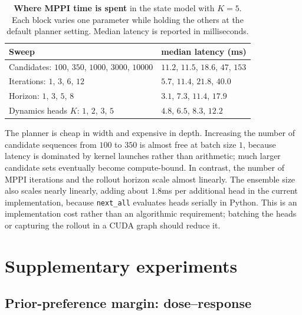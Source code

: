\documentclass{article} %
\begin{document}
\begin{table}[h]
\centering
\caption{%
  \textbf{Where MPPI time is spent} in the state model with $K=5$. Each block
  varies one parameter while holding the others at the default planner setting.
  Median latency is reported in milliseconds.}
\label{tab:app-mppi-breakdown}
\small
\begin{tabular}{ll}
\toprule
Sweep & median latency (ms) \\
\midrule
Candidates: $100$, $350$, $1000$, $3000$, $10000$
  & $11.2$, $11.5$, $18.6$, $47$, $153$ \\
Iterations: $1$, $3$, $6$, $12$
  & $5.7$, $11.4$, $21.8$, $40.0$ \\
Horizon: $1$, $3$, $5$, $8$
  & $3.1$, $7.3$, $11.4$, $17.9$ \\
Dynamics heads $K$: $1$, $2$, $3$, $5$
  & $4.8$, $6.5$, $8.3$, $12.2$ \\
\bottomrule
\end{tabular}
\end{table}

The planner is cheap in width and expensive in depth. Increasing the number of
candidate sequences from $100$ to $350$ is almost free at batch size $1$,
because latency is dominated by kernel launches rather than arithmetic; much
larger candidate sets eventually become compute-bound. In contrast, the number
of MPPI iterations and the rollout horizon scale almost linearly. The ensemble
size also scales nearly linearly, adding about $1.8$ms per additional head in
the current implementation, because \texttt{next\_all} evaluates heads
serially in Python. This is an implementation cost rather than an algorithmic
requirement; batching the heads or capturing the rollout in a CUDA graph should
reduce it.

\section{Supplementary experiments}

\subsection{Prior-preference margin: dose--response}
\end{document}

